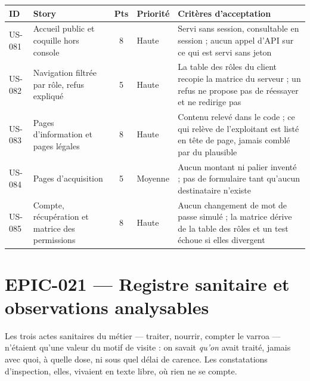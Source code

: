 \begin{center}
\begin{tabular}{lp{6.6cm}cl p{4.6cm}}
\toprule
\textbf{ID} & \textbf{Story} & \textbf{Pts} & \textbf{Priorité} & \textbf{Critères d'acceptation} \\
\midrule
US-081 & Accueil public et coquille hors console & 8 & Haute   & Servi sans session, consultable en session ; aucun appel d'API sur ce qui est servi sans jeton \\
US-082 & Navigation filtrée par rôle, refus expliqué & 5 & Haute & La table des rôles du client recopie la matrice du serveur ; un refus ne propose pas de réessayer et ne redirige pas \\
US-083 & Pages d'information et pages légales & 8 & Haute & Contenu relevé dans le code ; ce qui relève de l'exploitant est listé en tête de page, jamais comblé par du plausible \\
US-084 & Pages d'acquisition & 5 & Moyenne & Aucun montant ni palier inventé ; pas de formulaire tant qu'aucun destinataire n'existe \\
US-085 & Compte, récupération et matrice des permissions & 8 & Haute & Aucun changement de mot de passe simulé ; la matrice dérive de la table des rôles et un test échoue si elles divergent \\
\bottomrule
\end{tabular}
\end{center}

\section{EPIC-021 --- Registre sanitaire et observations analysables}

Les trois actes sanitaires du métier --- traiter, nourrir, compter le varroa ---
n'étaient qu'une valeur du motif de visite : on savait \emph{qu'on} avait traité,
jamais avec quoi, à quelle dose, ni sous quel délai de carence. Les constatations
d'inspection, elles, vivaient en texte libre, où rien ne se compte.


